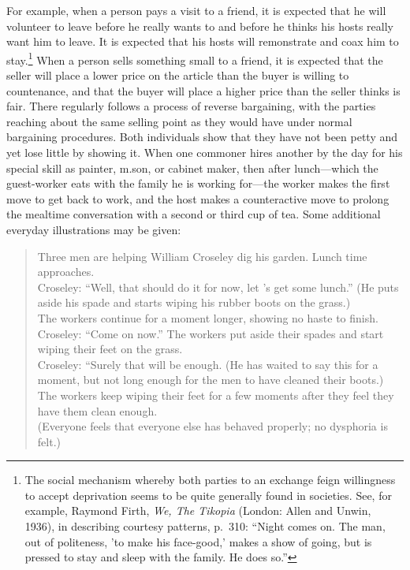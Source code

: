 \documentclass[twoside,symmetric,nobib,justified]{tufte-book}
\begin{document}
For example, when a person pays a visit to a friend, it is expected that
he will volunteer to leave before he really wants to and before he
thinks his hosts really want him to leave. It is expected that his hosts
will remonstrate and coax him to stay.\footnote{The social mechanism
  whereby both parties to an exchange feign willingness to accept
  deprivation seems to be quite generally found in societies. See, for
  example, Raymond Firth, \emph{We, The Tikopia} (London: Allen and
  Unwin, 1936), in describing courtesy patterns, p.~310: ``Night comes
  on. The man, out of politeness, 'to make his face-good,' makes a show
  of going, but is pressed to stay and sleep with the family. He does
  so.''} When a person sells something small to a friend, it is expected
that the seller will place a lower price on the article than the buyer
is willing to countenance, and that the buyer will place a higher price
than the seller thinks is fair. There regularly follows a process of
reverse bargaining, with the parties reaching about the same selling
point as they would have under normal bargaining procedures. Both
individuals show that they have not been petty and yet lose little by
showing it. When one commoner hires another by the day for his special
skill as painter, m.son, or cabinet maker, then after lunch---which the
guest-worker eats with the family he is working for---the worker makes
the first move to get back to work, and the host makes a counteractive
move to prolong the mealtime conversation with a second or third cup of
tea. Some additional everyday illustrations may be given:

\begin{quote}
Three men are helping William Croseley dig his garden. Lunch time
approaches. \\
Croseley: ``Well, that should do it for now, let 's get some lunch.''
(He puts aside his spade and starts wiping his rubber boots on the
grass.) \\
The workers continue for a moment longer, showing no haste to finish.
Croseley: ``Come on now.'' The workers put aside their spades and start
wiping their feet on the grass.\\
Croseley: ``Surely that will be enough. (He has waited to say this for a
moment, but not long enough for the men to have cleaned their boots.) \\
The workers keep wiping their feet for a few moments after they feel
they have them clean enough.\\
(Everyone feels that everyone else has behaved properly; no dysphoria is
felt.)
\end{quote}
\end{document}
